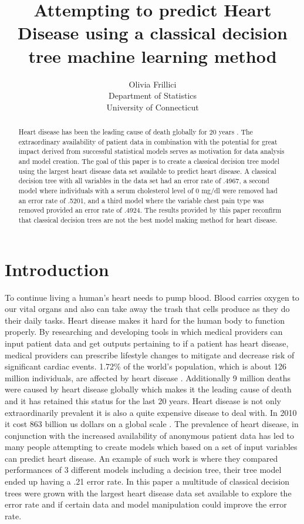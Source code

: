 \documentclass[12pt]{article}
\title{Attempting to predict Heart Disease using a classical decision tree machine learning method }
\author{Olivia Frillici\\
  Department of Statistics\\
  University of Connecticut
}
\begin{document}
\maketitle
\begin{abstract}
  Heart disease has been the leading cause of death globally for 20 years \citep{khan2020global}. The extraordinary availability of patient data in combination with the potential for great impact derived from successful statistical models serves as motivation for data analysis and model creation. The goal of this paper is to create a classical decision tree model using the largest heart disease data set available to predict heart disease. A classical decision tree with all variables in the data set had an error rate of .4967, a second model where individuals with a serum cholesterol level of 0 mg/dl were removed had an error rate of .5201, and a third model where the variable chest pain type was removed provided an error rate of .4924. The results provided by this paper reconfirm that classical decision trees are not the best model making method for heart disease. 
    \end{abstract}
    
    
    \section{Introduction}
    \label{sec:intro}
    
    To continue living a human’s heart needs to pump blood. Blood carries oxygen to our vital organs and also can take away the trash that cells produce as they do their daily tasks. Heart disease makes it hard for the human body to function properly. By researching and developing tools in which medical providers can input patient data and get outputs pertaining to if a patient has heart disease, medical providers can prescribe lifestyle changes to mitigate and decrease risk of significant cardiac events. 
1.72\% of the world’s population, which is about 126 million individuals, are affected by heart disease \citep{khan2020global}. Additionally 9 million deaths were caused by heart disease globally which makes it the leading cause of death and it has retained this status for the last 20 years\citep{khan2020global}. Heart disease is not only extraordinarily prevalent it is also a quite expensive disease to deal with. In 2010 it cost 863 billion us dollars on a global scale \citep{khan2020global}. 
The prevalence of heart disease, in conjunction with the increased availability of anonymous patient data has led to many people attempting to create models which based on a set of input variables can predict heart disease. An example of such work is \citet{5643666} where they compared performances of 3 different models including a decision tree, their tree model ended up having a .21 error rate. 
In this paper a multitude of classical decision trees were grown with the largest heart disease data set available to explore the error rate and if certain data and model manipulation could improve the error rate.
\end{document}
